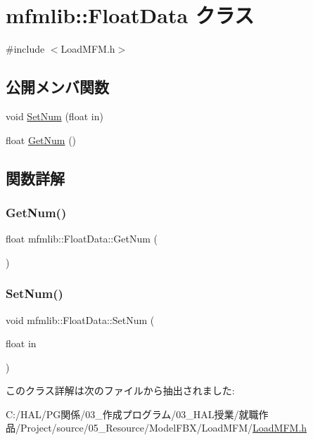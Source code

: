\hypertarget{classmfmlib_1_1_float_data}{}\section{mfmlib\+:\+:Float\+Data クラス}
\label{classmfmlib_1_1_float_data}


{\ttfamily \#include $<$Load\+M\+F\+M.\+h$>$}

\subsection*{公開メンバ関数}
\begin{DoxyCompactItemize}
\item 
void \mbox{\hyperlink{classmfmlib_1_1_float_data_a7c74124a56e159cdb8e9b540833daac2}{Set\+Num}} (float in)
\item 
float \mbox{\hyperlink{classmfmlib_1_1_float_data_a9abfe9174f63eea4a58668945adecd19}{Get\+Num}} ()
\end{DoxyCompactItemize}


\subsection{関数詳解}
\mbox{\label{classmfmlib_1_1_float_data_a9abfe9174f63eea4a58668945adecd19}} 
\subsubsection{\texorpdfstring{Get\+Num()}{GetNum()}}
{\footnotesize\ttfamily float mfmlib\+::\+Float\+Data\+::\+Get\+Num (\begin{DoxyParamCaption}{ }\end{DoxyParamCaption})\hspace{0.3cm}{\ttfamily [inline]}}

\mbox{\label{classmfmlib_1_1_float_data_a7c74124a56e159cdb8e9b540833daac2}} 
\subsubsection{\texorpdfstring{Set\+Num()}{SetNum()}}
{\footnotesize\ttfamily void mfmlib\+::\+Float\+Data\+::\+Set\+Num (\begin{DoxyParamCaption}\item[{float}]{in }\end{DoxyParamCaption})\hspace{0.3cm}{\ttfamily [inline]}}



このクラス詳解は次のファイルから抽出されました\+:\begin{DoxyCompactItemize}
\item 
C\+:/\+H\+A\+L/\+P\+G関係/03\+\_\+作成プログラム/03\+\_\+\+H\+A\+L授業/就職作品/\+Project/source/05\+\_\+\+Resource/\+Model\+F\+B\+X/\+Load\+M\+F\+M/\mbox{\hyperlink{_load_m_f_m_8h}{Load\+M\+F\+M.\+h}}\end{DoxyCompactItemize}
